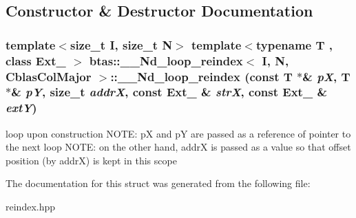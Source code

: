 \subsection{Constructor \& Destructor Documentation}
\hypertarget{structbtas_1_1_____nd__loop__reindex_3_01_i_00_01_n_00_01_cblas_col_major_01_4_a6b103d32a003b00633a0f70e66d037e4}{
\subsubsection[{\_\-\_\-Nd\_\-loop\_\-reindex}]{\setlength{\rightskip}{0pt plus 5cm}template$<$size\_\-t I, size\_\-t N$>$ template$<$typename T , class Ext\_\- $>$ btas::\_\-\_\-Nd\_\-loop\_\-reindex$<$ I, N, CblasColMajor $>$::\_\-\_\-Nd\_\-loop\_\-reindex (const T $\ast$\& {\em pX}, \/  T $\ast$\& {\em pY}, \/  size\_\-t {\em addrX}, \/  const Ext\_\- \& {\em strX}, \/  const Ext\_\- \& {\em extY})}}
\label{structbtas_1_1_____nd__loop__reindex_3_01_i_00_01_n_00_01_cblas_col_major_01_4_a6b103d32a003b00633a0f70e66d037e4}
loop upon construction NOTE: pX and pY are passed as a reference of pointer to the next loop NOTE: on the other hand, addrX is passed as a value so that offset position (by addrX) is kept in this scope 

The documentation for this struct was generated from the following file:\begin{DoxyCompactItemize}
\item 
reindex.hpp\end{DoxyCompactItemize}

